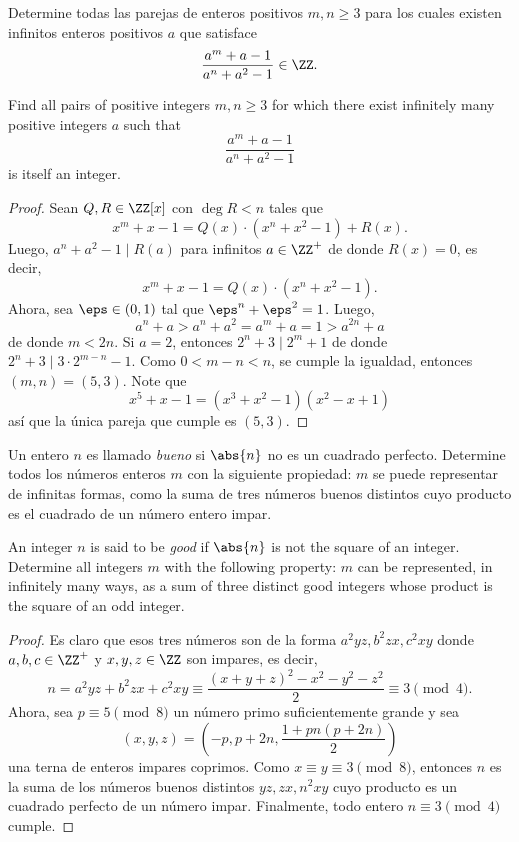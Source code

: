 \begin{probEG}[ISL 2002/N6]
	Determine todas las parejas de enteros positivos $m,n\ge 3$ para los cuales existen infinitos enteros positivos $a$ que satisface
	\[\frac{a^m+a-1}{a^n+a^2-1}\in\ZZ.\]
	\begin{hint}
		Find all pairs of positive integers $m,n\ge 3$ for which there exist infinitely many positive integers $a$ such that
		\[\frac{a^m+a-1}{a^n+a^2-1}\]
		is itself an integer.
	\end{hint}
\end{probEG}

\begin{proof}
	Sean $Q,R\in\ZZ[x]$ con $\deg R<n$ tales que
	\[x^m+x-1=Q(x)\cdot(x^n+x^2-1)+R(x).\]
	Luego, $a^n+a^2-1\mid R(a)$ para infinitos $a\in\ZZ^+$ de donde $R(x)=0$, es decir,
	\[x^m+x-1=Q(x)\cdot(x^n+x^2-1).\]
	Ahora, sea $\eps\in(0,1)$ tal que $\eps^n+\eps^2=1$. Luego,
	\[a^n+a>a^n+a^2=a^m+a=1>a^{2n}+a\]
	de donde $m<2n$. Si $a=2$, entonces $2^n+3\mid 2^m+1$ de donde $2^n+3\mid 3\cdot 2^{m-n}-1$. Como $0<m-n<n$, se cumple la igualdad, entonces $(m,n)=(5,3)$. Note que
	\[x^5+x-1=(x^3+x^2-1)(x^2-x+1)\]
	así que la única pareja que cumple es $(5,3)$.
\end{proof}

\begin{probMG}[ISL 2003/N5]
	Un entero $n$ es llamado \emph{bueno} si $\abs{n}$ no es un cuadrado perfecto. Determine todos los números enteros $m$ con la siguiente propiedad: $m$ se puede representar de infinitas formas, como la suma de tres números buenos distintos cuyo producto es el cuadrado de un número entero impar.
	\begin{hint}
		An integer $n$ is said to be \emph{good} if $\abs{n}$ is not the square of an integer. Determine all integers $m$ with the following property: $m$ can be represented, in infinitely many ways, as a sum of three distinct good integers whose product is the square of an odd integer.
	\end{hint}
\end{probMG}

\begin{proof}
	Es claro que esos tres números son de la forma $a^2yz,b^2zx,c^2xy$ donde $a,b,c\in\ZZ^+$ y $x,y,z\in\ZZ$ son impares, es decir,
	\[n=a^2yz+b^2zx+c^2xy\equiv\frac{(x+y+z)^2-x^2-y^2-z^2}{2}\equiv 3\pmod 4.\]
	Ahora, sea $p\equiv 5\pmod 8$ un número primo suficientemente grande y sea
	\[(x,y,z)=\left(-p,p+2n,\frac{1+pn(p+2n)}{2}\right)\]
	una terna de enteros impares coprimos. Como $x\equiv y\equiv 3\pmod 8$, entonces $n$ es la suma de los números buenos distintos $yz,zx,n^2xy$ cuyo producto es un cuadrado perfecto de un número impar. Finalmente, todo entero $n\equiv 3\pmod 4$ cumple.
\end{proof}

